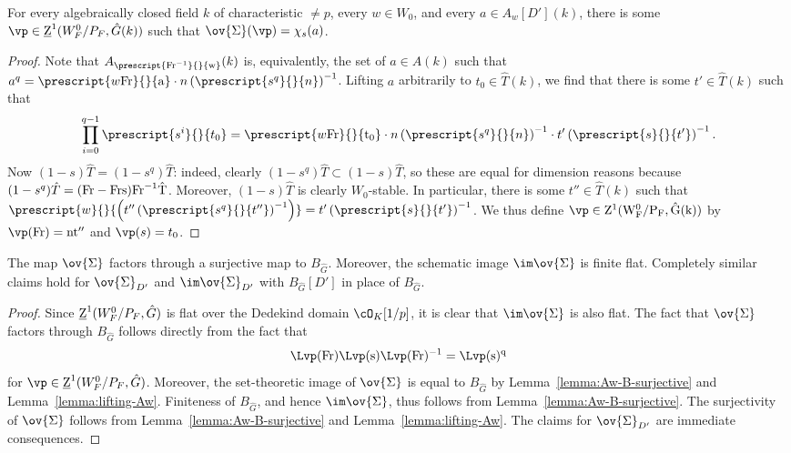 \begin{lemma}\label{lemma:lifting-Aw}
    For every algebraically closed field $k$ of characteristic $\neq p$, every $w \in W_0$, and every $a \in A_w[D'](k)$, there is some $\vp \in \underline{\rm{Z}}^1(W_F^0/P_F, \hat{G}(k))$ such that $\ov{\Sigma}(\vp) = \chi_s(a)$.
\end{lemma}

\begin{proof}
    Note that $A_{\prescript{\rm{Fr}^{-1}}{}{w}}(k)$ is, equivalently, the set of $a \in A(k)$ such that $a^q = \prescript{w\rm{Fr}}{}{a} \cdot n \left(\prescript{s^q}{}{n}\right)^{-1}$. Lifting $a$ arbitrarily to $t_0 \in \hat{T}(k)$, we find that there is some $t' \in \hat{T}(k)$ such that
    \[
    \prod_{i=0}^{q-1} \prescript{s^i}{}{t_0} = \prescript{w\rm{Fr}}{}{t_0} \cdot n\left(\prescript{s^q}{}{n}\right)^{-1} \cdot t' \left(\prescript{s}{}{t'}\right)^{-1}.
    \]
    Now $(1 - s)\hat{T} = (1 - s^q)\hat{T}$: indeed, clearly $(1 - s^q)\hat{T} \subset (1 - s)\hat{T}$, so these are equal for dimension reasons because $(1 - s^q)\hat{T} = (\rm{Fr} - \rm{Fr}s)\rm{Fr}^{-1}\hat{T}$. Moreover, $(1 - s)\hat{T}$ is clearly $W_0$-stable. In particular, there is some $t'' \in \hat{T}(k)$ such that $\prescript{w}{}{\left(t''\left(\prescript{s^q}{}{t''}\right)^{-1}\right)} = t'\left(\prescript{s}{}{t'}\right)^{-1}$. We thus define $\vp \in \rm{Z}^1(W_F^0/P_F, \hat{G}(k))$ by $\vp(\rm{Fr}) = nt''$ and $\vp(s) = t_0$.
\end{proof}

\begin{lemma}\label{lemma:finite-image-git}
    The map $\ov{\Sigma}$ factors through a surjective map to $B_{\hat{G}}$. Moreover, the schematic image $\im \ov{\Sigma}$ is finite flat. Completely similar claims hold for $\ov{\Sigma}_{D'}$ and $\im \ov{\Sigma}_{D'}$ with $B_{\hat{G}}[D']$ in place of $B_{\hat{G}}$.
\end{lemma}

\begin{proof}
    Since $\underline{\rm{Z}}^1(W_F^0/P_F, \hat{G})$ is flat over the Dedekind domain $\cO_K[1/p]$, it is clear that $\im \ov{\Sigma}$ is also flat. The fact that $\ov{\Sigma}$ factors through $B_{\hat{G}}$ follows directly from the fact that
    \[
    \Lvp(\rm{Fr})\Lvp(s)\Lvp(\rm{Fr})^{-1} = \Lvp(s)^q
    \]
    for $\vp \in \underline{\rm{Z}}^1(W_F^0/P_F, \hat{G})$. Moreover, the set-theoretic image of $\ov{\Sigma}$ is equal to $B_{\hat{G}}$ by Lemma~\ref{lemma:Aw-B-surjective} and Lemma~\ref{lemma:lifting-Aw}. Finiteness of $B_{\hat{G}}$, and hence $\im \ov{\Sigma}$, thus follows from Lemma~\ref{lemma:Aw-B-surjective}. The surjectivity of $\ov{\Sigma}$ follows from Lemma~\ref{lemma:Aw-B-surjective} and Lemma~\ref{lemma:lifting-Aw}. The claims for $\ov{\Sigma}_{D'}$ are immediate consequences.
\end{proof}

